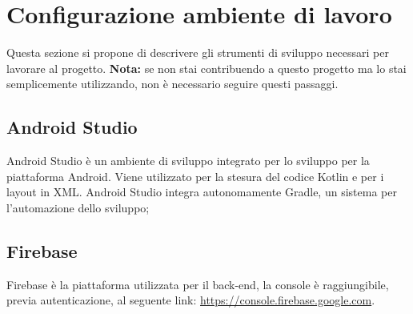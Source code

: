 \section{Configurazione ambiente di lavoro}
Questa sezione si propone di descrivere gli strumenti di sviluppo necessari per lavorare al progetto.
\textbf{Nota:} se non stai contribuendo a questo progetto ma lo stai semplicemente utilizzando, non è necessario seguire questi passaggi.
\subsection{Android Studio}
Android Studio è un ambiente di sviluppo integrato per lo sviluppo per la piattaforma Android. Viene utilizzato per la stesura del codice Kotlin e per i layout in XML. Android Studio integra autonomamente Gradle, un sistema per l'automazione dello sviluppo;
\subsection{Firebase}
Firebase è la piattaforma utilizzata per il back-end, la console è raggiungibile, previa autenticazione, al seguente link: \url{https://console.firebase.google.com}.

